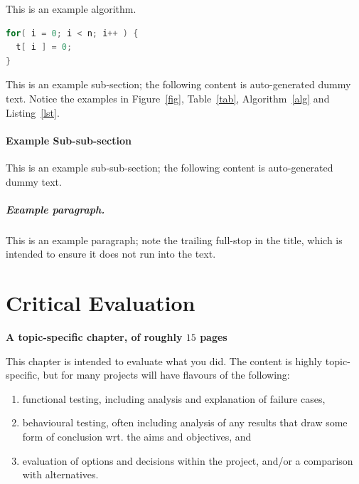 \documentclass[ %
                    author={Tom Jager},
                supervisor={Dr. Daniel Schien},
                    degree={MEng},
                     title={A Bayesian Inference Engine for UMIS Structured Data},
                  subtitle={},
                      type={research},
                      year={2019} ]{dissertation}
\begin{document}
\begin{algorithm}[t]
\caption{This is an example algorithm.}
\label{alg}
\end{algorithm}

\begin{lstlisting}[float={t},caption={This is an example listing.},label={lst},language=C]
for( i = 0; i < n; i++ ) {
  t[ i ] = 0;
}
\end{lstlisting}

This is an example sub-section;
the following content is auto-generated dummy text.
Notice the examples in Figure~\ref{fig}, Table~\ref{tab}, Algorithm~\ref{alg}
and Listing~\ref{lst}.
\lipsum

\subsubsection{Example Sub-sub-section}

This is an example sub-sub-section;
the following content is auto-generated dummy text.
\lipsum

\paragraph{Example paragraph.}

This is an example paragraph; note the trailing full-stop in the title,
which is intended to ensure it does not run into the text.


\chapter{Critical Evaluation}
\label{chap:evaluation}

{\bf A topic-specific chapter, of roughly $15$ pages} 
\vspace{1cm} 

\noindent
This chapter is intended to evaluate what you did.  The content is highly 
topic-specific, but for many projects will have flavours of the following:

\begin{enumerate}
\item functional  testing, including analysis and explanation of failure 
      cases,
\item behavioural testing, often including analysis of any results that 
      draw some form of conclusion wrt. the aims and objectives,
      and
\item evaluation of options and decisions within the project, and/or a
      comparison with alternatives.
\end{enumerate}
\end{document}
